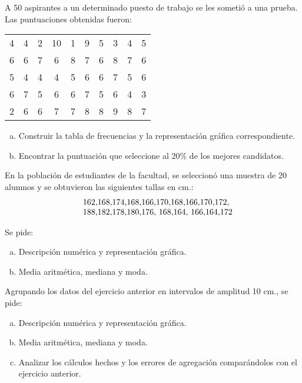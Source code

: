 \documentclass[12pt]{article}
\begin{document}
\begin{prob}A 50 aspirantes a un determinado puesto de trabajo se
les sometió a una prueba. Las puntuaciones obtenidas fueron:
\begin{center}
\begin{tabular}{cccccccccc}
4 & 4 & 2 & 10 & 1 & 9 & 5 & 3 & 4 & 5 \\ 6 & 6 & 7 & 6 & 8 & 7 & 6 & 8 & 7 & 6 \\ 5 & 4
& 4 & 4 & 5 & 6 & 6 & 7 & 5 & 6 \\ 6 & 7 & 5 & 6 & 6 & 7 & 5 & 6 & 4 & 3 \\ 2 & 6 & 6 & 7
& 7 & 8 & 8 & 9 & 8 & 7
\end{tabular}
\end{center}
\begin{enumerate}[a)]
\item {Construir la tabla de frecuencias y la representación
gráfica correspondiente.}
\item {Encontrar la puntuación que seleccione al 20\% de los
mejores candidatos.}
\end{enumerate}
\end{prob}
\begin{prob}En la población de estudiantes de la facultad, se
seleccionó  una muestra de 20 alumnos y se obtuvieron  las siguientes tallas en cm.:
$$
\begin{tabular}{ll}
&162,168,174,168,166,170,168,166,170,172,\\ & 188,182,178,180,176, 168,164, 166,164,172
\end{tabular}
$$

Se pide:
\begin{enumerate}[a)]
\item{Descripción numérica y representación gráfica.}
\item {Media aritmética, mediana y moda.}
\end{enumerate}
\end{prob}
\begin{prob}Agrupando los datos del ejercicio anterior en intervalos
de amplitud 10 cm., se pide:
\begin{enumerate}[a)]
\item {Descripción numérica y representación gráfica.}
\item {Media aritmética, mediana  y moda.}
\item {Analizar los cálculos hechos y los errores de agregación
comparándolos con el ejercicio anterior.}
\end{enumerate}
\end{prob}
\end{document}
